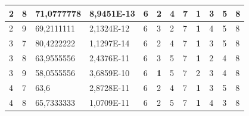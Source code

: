 \documentclass[conference]{IEEEtran}
\begin{document}
\begin{table}[]
\begin{tabular}{|llll|llllllll|}
		\multicolumn{1}{|l|}{2}   & \multicolumn{1}{l|}{8}         & \multicolumn{1}{l|}{71,0777778}    & 8,9451E-13 & \multicolumn{1}{l|}{6}   & \multicolumn{1}{l|}{2}          & \multicolumn{1}{l|}{4}          & \multicolumn{1}{l|}{7}   & \multicolumn{1}{l|}{\textbf{1}} & \multicolumn{1}{l|}{3}          & \multicolumn{1}{l|}{5}          & 8                      \\ \hline
		\multicolumn{1}{|l|}{2}   & \multicolumn{1}{l|}{9}         & \multicolumn{1}{l|}{69,2111111}    & 2,1324E-12 & \multicolumn{1}{l|}{6}   & \multicolumn{1}{l|}{3}          & \multicolumn{1}{l|}{2}          & \multicolumn{1}{l|}{7}   & \multicolumn{1}{l|}{\textbf{1}} & \multicolumn{1}{l|}{4}          & \multicolumn{1}{l|}{5}          & 8                      \\ \hline
		\multicolumn{1}{|l|}{3}   & \multicolumn{1}{l|}{7}         & \multicolumn{1}{l|}{80,4222222}    & 1,1297E-14 & \multicolumn{1}{l|}{6}   & \multicolumn{1}{l|}{2}          & \multicolumn{1}{l|}{4}          & \multicolumn{1}{l|}{7}   & \multicolumn{1}{l|}{\textbf{1}} & \multicolumn{1}{l|}{3}          & \multicolumn{1}{l|}{5}          & 8                      \\ \hline
		\multicolumn{1}{|l|}{3}   & \multicolumn{1}{l|}{8}         & \multicolumn{1}{l|}{63,9555556}    & 2,4376E-11 & \multicolumn{1}{l|}{6}   & \multicolumn{1}{l|}{3}          & \multicolumn{1}{l|}{5}          & \multicolumn{1}{l|}{7}   & \multicolumn{1}{l|}{\textbf{1}} & \multicolumn{1}{l|}{2}          & \multicolumn{1}{l|}{4}          & 8                      \\ \hline
		\multicolumn{1}{|l|}{3}   & \multicolumn{1}{l|}{9}         & \multicolumn{1}{l|}{58,0555556}    & 3,6859E-10 & \multicolumn{1}{l|}{6}   & \multicolumn{1}{l|}{\textbf{1}} & \multicolumn{1}{l|}{5}          & \multicolumn{1}{l|}{7}   & \multicolumn{1}{l|}{2}          & \multicolumn{1}{l|}{3}          & \multicolumn{1}{l|}{4}          & 8                      \\ \hline
		\multicolumn{1}{|l|}{4}   & \multicolumn{1}{l|}{7}         & \multicolumn{1}{l|}{63,6}          & 2,8728E-11 & \multicolumn{1}{l|}{6}   & \multicolumn{1}{l|}{2}          & \multicolumn{1}{l|}{4}          & \multicolumn{1}{l|}{7}   & \multicolumn{1}{l|}{\textbf{1}} & \multicolumn{1}{l|}{3}          & \multicolumn{1}{l|}{5}          & 8                      \\ \hline
		\multicolumn{1}{|l|}{4}   & \multicolumn{1}{l|}{8}         & \multicolumn{1}{l|}{65,7333333}    & 1,0709E-11 & \multicolumn{1}{l|}{6}   & \multicolumn{1}{l|}{2}          & \multicolumn{1}{l|}{5}          & \multicolumn{1}{l|}{7}   & \multicolumn{1}{l|}{\textbf{1}} & \multicolumn{1}{l|}{4}          & \multicolumn{1}{l|}{3}          & 8                      \\ \hline

\end{tabular}
\end{table}
\end{document}
